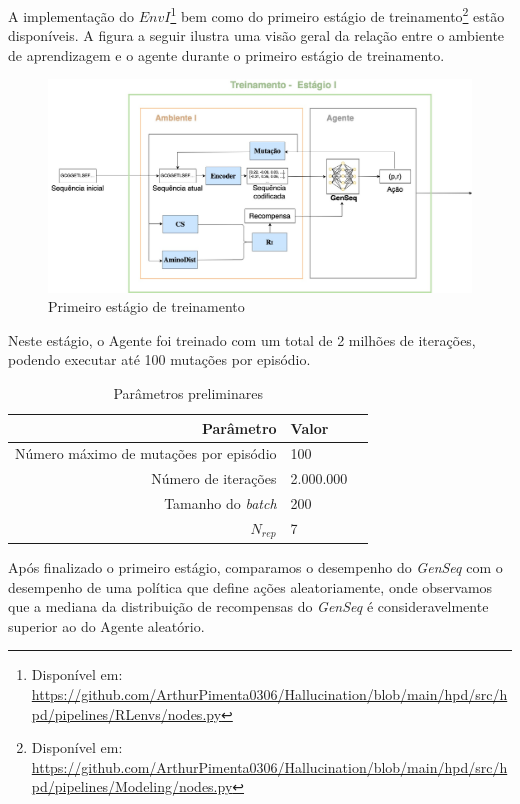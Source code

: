 A implementação do $EnvI$\footnote{Disponível em: \url{https://github.com/ArthurPimenta0306/Hallucination/blob/main/hpd/src/hpd/pipelines/RLenvs/nodes.py}}
bem como do primeiro estágio de treinamento\footnote{Disponível em: \url{https://github.com/ArthurPimenta0306/Hallucination/blob/main/hpd/src/hpd/pipelines/Modeling/nodes.py}}
estão disponíveis. A figura a seguir ilustra uma visão geral da relação entre o ambiente de aprendizagem e o agente durante o primeiro estágio de treinamento.

\begin{figure}[H]
  \centering
  \includegraphics[width=.9\textwidth]{figuras/metodologia-Pre-Training.jpg}
  \caption{Primeiro estágio de treinamento}
\end{figure}


Neste estágio, o Agente foi treinado com um total de 2 milhões de iterações, podendo executar até 100 mutações por episódio.
\begin{table}[H]
  \centering
  \vspace{0.5cm}
  \begin{tabular}{r|lr}
  Parâmetro & Valor \\ 
  \hline                               %
  Número máximo de mutações por episódio & 100 \\
  Número de iterações & 2.000.000 \\
  Tamanho do \textit{batch} & 200 \\
  $N_{rep}$ & 7 \\
  \end{tabular}
  \caption{Parâmetros preliminares}
  \end{table}

  Após finalizado o primeiro estágio, comparamos o desempenho do \textit{GenSeq} com o desempenho de uma política que define ações aleatoriamente, onde observamos
  que a mediana da distribuição de recompensas do \textit{GenSeq} é consideravelmente superior ao do Agente aleatório. 

